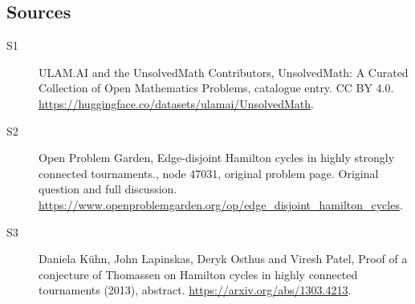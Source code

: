 \documentclass[11pt]{article}
\begin{document}
\subsection{Sources}
\begin{description}
\item[\hypertarget{source:statement:1}{S1}] ULAM.AI and the UnsolvedMath Contributors, UnsolvedMath: A Curated Collection of Open Mathematics Problems, catalogue entry. CC BY 4.0. \url{https://huggingface.co/datasets/ulamai/UnsolvedMath}.
\item[\hypertarget{source:statement:2}{S2}] Open Problem Garden, Edge-disjoint Hamilton cycles in highly strongly connected tournaments., node 47031, original problem page. Original question and full discussion. \url{https://www.openproblemgarden.org/op/edge_disjoint_hamilton_cycles}.
\item[\hypertarget{source:statement:3}{S3}] Daniela Kühn, John Lapinskas, Deryk Osthus and Viresh Patel, Proof of a conjecture of Thomassen on Hamilton cycles in highly connected tournaments (2013), abstract. \url{https://arxiv.org/abs/1303.4213}.
\end{description}
\label{end:statement}
\end{document}
